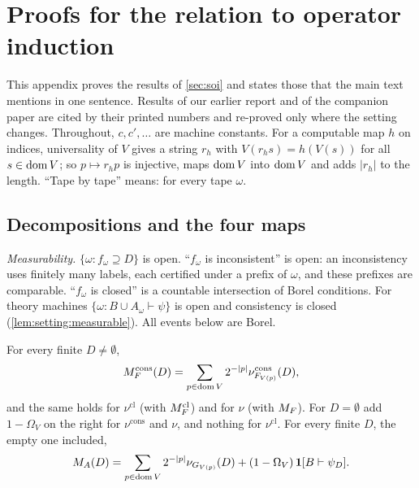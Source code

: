\section{Proofs for the relation to operator induction}\label{app:soi}

This appendix proves the results of \cref{sec:soi} and states those that the main text mentions in one sentence. Results of our earlier report \citep{claude2026axiominduction} and of the companion paper \citep{claudeSFI2026fundamentals} are cited by their printed numbers and re-proved only where the setting changes. Throughout, $c,c',\dots$ are machine constants. For a computable map $h$ on indices, universality of $V$ gives a string $r_h$ with $V(r_hs)=h(V(s))$ for all $s\in\operatorname{dom} V$; so $p\mapsto r_hp$ is injective, maps $\operatorname{dom} V$ into $\operatorname{dom} V$ and adds $\lvert r_h\rvert$ to the length. ``Tape by tape'' means: for every tape $\omega$.

\subsection{Decompositions and the four maps}\label{sec:app:soi:maps}

\emph{Measurability.} $\{\omega:f_\omega\supseteq D\}$ is open. ``$f_\omega$ is inconsistent'' is open: an inconsistency uses finitely many labels, each certified under a prefix of $\omega$, and these prefixes are comparable. ``$f_\omega$ is closed'' is a countable intersection of Borel conditions. For theory machines $\{\omega:B\cup A_\omega\vdash\psi\}$ is open and consistency is closed (\cref{lem:setting:measurable}). All events below are Borel.

\begin{lemma}\label{lem:soi:mixture}
For every finite $D\ne\emptyset$,
\begin{equation}\label{eq:soi:mixF}
M_{F}^{\mathrm{cons}}(D)=\sum_{p\in\operatorname{dom} V}2^{-\lvert p\rvert}\nu^{\mathrm{cons}}_{F_{V(p)}}(D),
\end{equation}
and the same holds for $\nu^{\mathrm{cl}}$ (with $M_{F}^{\mathrm{cl}}$) and for $\nu$ (with $M_{F}$). For $D=\emptyset$ add $1-\Omega_V$ on the right for $\nu^{\mathrm{cons}}$ and $\nu$, and nothing for $\nu^{\mathrm{cl}}$. For every finite $D$, the empty one included,
\begin{equation}\label{eq:soi:mixA}
M_{A}(D)=\sum_{p\in\operatorname{dom} V}2^{-\lvert p\rvert}\nu_{G_{V(p)}}(D)+(1-\Omega_V)\,\mathbf{1}[B\vdash\psi_D].
\end{equation}
\end{lemma}

